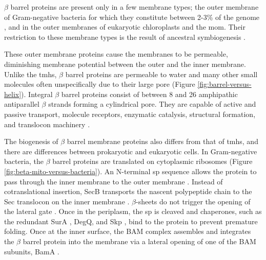 $\beta$ barrel proteins are present only in a few membrane types; the outer membrane of Gram\--negative bacteria for which they constitute between 2-3\% of the genome \cite{Wimley2003}, and in the outer membranes of eukaryotic chloroplasts and the \gls{mom}.
Their restriction to these membrane types is the result of ancestral symbiogenesis \cite{McFadden2001, Gray1999, Fischer1994, Zeth2010, Fairman2011, Ulrich2015}.

These outer membrane proteins cause the membranes to be permeable, diminishing membrane potential between the outer and the inner membrane.
Unlike the \gls{tmh}s, $\beta$ barrel proteins are permeable to water and many other small molecules often unspecifically due to their large pore (Figure \ref{fig:barrel-versus-helix}).
Integral $\beta$ barrel proteins consist of between 8 and 26 amphipathic antiparallel $\beta$ strands forming a cylindrical pore.
They are capable of active and passive transport, molecule receptors, enzymatic catalysis, structural formation, and translocon machinery \cite{Wimley2003}.

The biogenesis of $\beta$ barrel membrane proteins also differs from that of \gls{tmh}s, and there are differences between prokaryotic and eukaryotic cells.
In Gram\--negative bacteria, the $\beta$ barrel proteins are translated on cytoplasmic ribosomes (Figure \ref{fig:beta-mito-versus-bacteria}).
An N-terminal \gls{sp} sequence allows the protein to pass through the inner membrane to the outer membrane \cite{Driessen2008, Papanikou2007}.
Instead of cotranslational insertion, SecB transports the nascent polypeptide chain to the Sec translocon on the inner membrane \cite{Bechtluft2010}.
$\beta$\--sheets do not trigger the opening of the lateral gate \cite{Ulrich2015}.
Once in the periplasm, the \gls{sp} is cleaved \cite{Paetzel2014} and chaperones, such as the redundant SurA \cite{Lazar1996, Volokhina2011}, DegQ, and Skp \cite{Volokhina2011}, bind to the protein to prevent premature folding.
Once at the inner surface, the BAM complex assembles and integrates the $\beta$ barrel protein into the membrane \cite{Wu2005, Hagan2010} via a lateral opening of one of the BAM subunits, BamA \cite{Noinaj2014}.

